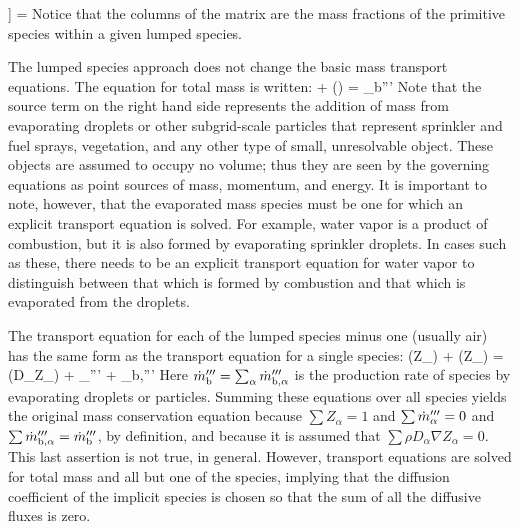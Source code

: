 \right]
\left[ \begin{array} {c} Z_{\rm A} \\ Z_{\rm F} \\ Z_{\rm P} \end{array} \right] =
 \ee
Notice that the columns of the matrix are the mass fractions of the primitive species within a given lumped species.

The lumped species approach does not change the basic mass transport equations. The equation for total mass is written:
\be {} + \nabla\!\cdot (\rho \bu)  =  \dm_{\rm b}'''  \label{mass} \ee
Note that the source term on the right hand side represents the addition of mass from evaporating droplets or other subgrid-scale
particles that represent sprinkler and fuel sprays, vegetation, and any other type of small, unresolvable object. These
objects are assumed to occupy no volume; thus they are seen by the governing equations as point sources of mass, momentum, and energy. It is important to
note, however, that the evaporated mass species must be one for which an explicit transport equation is solved. For example, water vapor is a product of
combustion, but it is also formed by evaporating sprinkler droplets. In cases such as these, there needs to be an explicit transport equation for water
vapor to distinguish between that which is formed by combustion and that which is evaporated from the droplets.

The transport equation for each of the lumped species minus one (usually air) has the same form as the transport equation for a single species:
\be {}(\rho Z_\alpha) + \nabla\!\cdot (\rho Z_\alpha \bu) = \nabla\!\cdot (\rho D_\alpha \nabla Z_\alpha) + \dm_\alpha''' + \dm_{\rm b,\alpha}''' \label{species} \ee
Here $\dot{m}_{\rm b}'''=\sum_\alpha \dot{m}_{\rm b,\alpha}'''$ is the production rate of species by evaporating droplets or particles.
Summing these equations over all species yields the original mass conservation equation because
$\sum Z_\alpha=1$ and $\sum \dot{m}_\alpha''' = 0$ and $\sum \dot{m}_{\rm b,\alpha}'''=\dot{m}_{\rm b}'''$, by definition, and because it is assumed
that $\sum \rho D_\alpha \nabla Z_\alpha = 0$. This last assertion is not true, in general.
However, transport equations are solved for total
mass and all but one of the species, implying that the diffusion coefficient of the implicit species is
chosen so that the sum of all the diffusive fluxes is zero.

